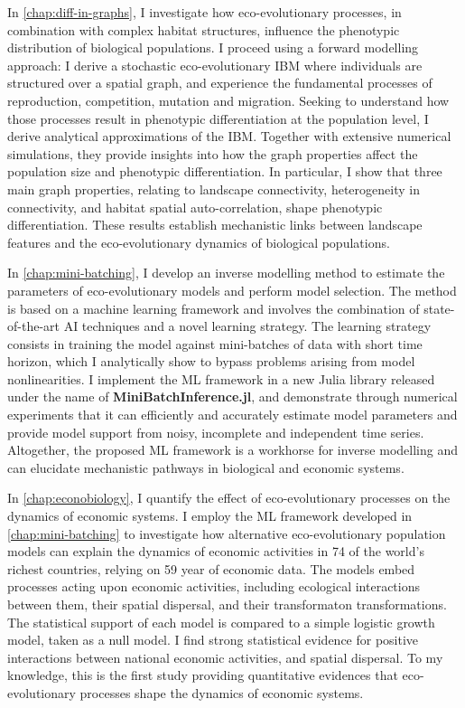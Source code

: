 In \cref{chap:diff-in-graphs}, I investigate how eco-evolutionary processes, in combination with complex habitat structures, influence the phenotypic distribution of biological populations. 
I proceed using a forward modelling approach: I derive a stochastic eco-evolutionary IBM where individuals are structured over a spatial graph, and experience the fundamental processes of reproduction, competition, mutation and migration. Seeking to understand how those processes result in phenotypic differentiation at the population level, I derive analytical approximations of the IBM. Together with extensive numerical simulations, they provide insights into how the graph properties affect the population size and phenotypic differentiation. In particular, I show that three main graph properties, relating to landscape connectivity, heterogeneity in connectivity, and habitat spatial auto-correlation, shape phenotypic differentiation. These results establish mechanistic links between landscape features and the eco-evolutionary dynamics of biological populations.

In \cref{chap:mini-batching}, I develop an inverse modelling method to estimate the parameters of eco-evolutionary models and perform model selection. The method is based on a machine learning framework and involves the combination of state-of-the-art AI techniques and a novel learning strategy. The learning strategy consists in training the model against mini-batches of data with short time horizon, which I analytically show to bypass problems arising from model nonlinearities. I implement the ML framework in a new Julia library released under the name of \textbf{MiniBatchInference.jl}, and demonstrate through numerical experiments that it can efficiently and accurately estimate model parameters and provide model support from noisy, incomplete and independent time series. Altogether, the proposed ML framework is a workhorse for inverse modelling and can elucidate mechanistic pathways in biological and economic systems.

In \cref{chap:econobiology}, I quantify the effect of eco-evolutionary processes on the dynamics of economic systems. I employ the ML framework developed in \cref{chap:mini-batching} to investigate how alternative eco-evolutionary population models can explain the dynamics of economic activities in 74 of the world's richest countries, relying on 59 year of economic data. The models embed processes acting upon economic activities, including ecological interactions between them, their spatial dispersal, and their transformaton transformations. The statistical support of each model is compared to a simple logistic growth model, taken as a null model. I find strong statistical evidence for positive interactions between national economic activities, and spatial dispersal. To my knowledge, this is the first study providing quantitative evidences that eco-evolutionary processes shape the dynamics of economic systems.

